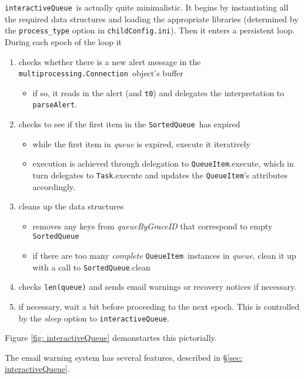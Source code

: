 \documentclass{article}
\newcommand{\multiprocessingConnection}{\texttt{multiprocessing.Connection}}
\newcommand{\interactiveQueue}{\texttt{interactiveQueue}}
\newcommand{\parseAlert}{\texttt{parseAlert}}
\newcommand{\SortedQueue}{\texttt{SortedQueue}}
\newcommand{\QueueItem}{\texttt{QueueItem}}
\newcommand{\Task}{\texttt{Task}}
\newcommand{\childConfigini}{\texttt{childConfig.ini}}
\begin{document}
\interactiveQueue~is actually quite minimalistic. 
It begins by instantiating all the required data structures and loading the appropriate libraries (determined by the \texttt{process\_type} option in \childConfigini).
Then it enters a persistent loop.
During each epoch of the loop it
\begin{enumerate}
    \item{checks whether there is a new alert message in the \multiprocessingConnection~object's buffer
        \begin{itemize}
            \item{if so, it reads in the alert (and \texttt{t0}) and delegates the interpretation to \parseAlert.}
        \end{itemize}
         }
    \item{checks to see if the first item in the \SortedQueue~has expired
        \begin{itemize}
            \item{while the first item in \textit{queue} is expired, execute it iteratively}
            \item{execution is achieved through delegation to \QueueItem.execute, which in turn delegates to \Task.execute and updates the \QueueItem's attributes accordingly.}
        \end{itemize}
         }
    \item{cleans up the data structures
        \begin{itemize}
            \item{removes any keys from \textit{queueByGraceID} that correspond to empty \SortedQueue}
            \item{if there are too many \textit{complete} \QueueItem~instances in \textit{queue}, clean it up with a call to \SortedQueue.clean}
        \end{itemize}
         }
    \item{checks \texttt{len(queue)} and sends email warnings or recovery notices if necessary.}
    \item{if necessary, wait a bit before proceeding to the next epoch. This is controlled by the \textit{sleep} option to \interactiveQueue.}
\end{enumerate}
Figure \ref{fig: interactiveQueue} demonstartes this pictorially.

The email warning system has several features, described in \S\ref{sec: interactiveQueue}.
\end{document}

